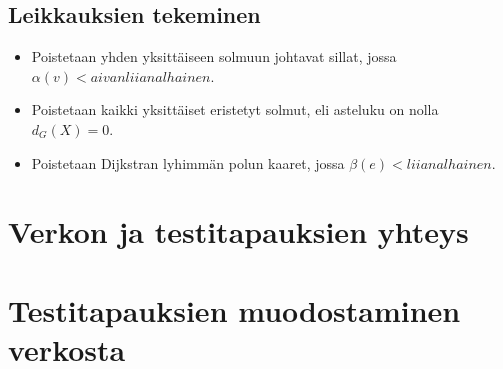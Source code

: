   \subsection{Leikkauksien tekeminen} \label{10_leikkauksien_tekeminen}

  \begin{itemize}
    \item Poistetaan yhden yksittäiseen solmuun johtavat sillat, jossa \(\alpha(v) < aivan liian alhainen \).
    \item Poistetaan kaikki yksittäiset eristetyt solmut, eli asteluku on nolla \(d_G(X) = 0\).
    \item Poistetaan Dijkstran lyhimmän polun kaaret, jossa \(\beta(e) < liian alhainen \).
  \end{itemize}

\section{Verkon ja testitapauksien yhteys} \label{10_verkon_ja_testitapauksien_yhteys}


\section{Testitapauksien muodostaminen verkosta} \label{10_testitapauksien_muodostaminen_verkosta}

